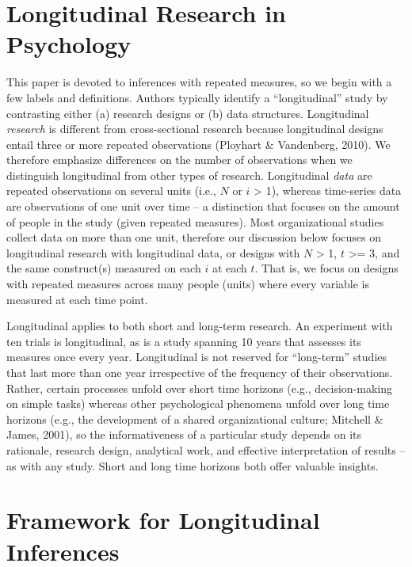 \documentclass[english,,man]{apa6}
\theoremstyle{definition}
\theoremstyle{definition}
\theoremstyle{definition}
\theoremstyle{remark}
\begin{document}
\hypertarget{longitudinal-research-in-psychology}{%
\section{Longitudinal Research in
Psychology}\label{longitudinal-research-in-psychology}}

This paper is devoted to inferences with repeated measures, so we begin
with a few labels and definitions. Authors typically identify a
\enquote{longitudinal} study by contrasting either (a) research designs
or (b) data structures. Longitudinal \emph{research} is different from
cross-sectional research because longitudinal designs entail three or
more repeated observations (Ployhart \& Vandenberg, 2010). We therefore
emphasize differences on the number of observations when we distinguish
longitudinal from other types of research. Longitudinal \emph{data} are
repeated observations on several units (i.e., \(N\) or \(i\)
\textgreater{} 1), whereas time-series data are observations of one unit
over time -- a distinction that focuses on the amount of people in the
study (given repeated measures). Most organizational studies collect
data on more than one unit, therefore our discussion below focuses on
longitudinal research with longitudinal data, or designs with \(N\)
\textgreater{} 1, \(t\) \textgreater{}= 3, and the same construct(s)
measured on each \(i\) at each \(t\). That is, we focus on designs with
repeated measures across many people (units) where every variable is
measured at each time point.

Longitudinal applies to both short and long-term research. An experiment
with ten trials is longitudinal, as is a study spanning 10 years that
assesses its measures once every year. Longitudinal is not reserved for
\enquote{long-term} studies that last more than one year irrespective of
the frequency of their observations. Rather, certain processes unfold
over short time horizons (e.g., decision-making on simple tasks) whereas
other psychological phenomena unfold over long time horizons (e.g., the
development of a shared organizational culture; Mitchell \& James,
2001), so the informativeness of a particular study depends on its
rationale, research design, analytical work, and effective
interpretation of results -- as with any study. Short and long time
horizons both offer valuable insights.

\hypertarget{framework-for-longitudinal-inferences}{%
\section{Framework for Longitudinal
Inferences}\label{framework-for-longitudinal-inferences}}
\end{document}
